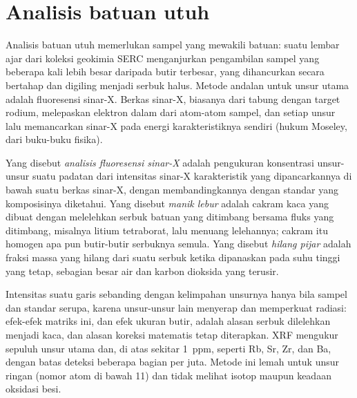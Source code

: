 
\section{Analisis batuan utuh}\label{sec:b2:field-lab-methods-2:whole-rock}

Analisis batuan utuh memerlukan sampel yang mewakili batuan: suatu lembar ajar dari koleksi geokimia
SERC menganjurkan pengambilan sampel yang beberapa kali lebih besar daripada butir terbesar,
yang dihancurkan secara bertahap dan digiling menjadi serbuk halus. Metode andalan untuk unsur utama adalah
fluoresensi sinar-X. Berkas sinar-X, biasanya dari tabung dengan target rodium, melepaskan elektron
dalam dari atom-atom sampel, dan setiap unsur lalu memancarkan sinar-X pada energi
karakteristiknya sendiri (hukum Moseley, dari buku-buku fisika).

\begin{definition}\label{def:b2:field-lab-methods-2:xrf}
Yang disebut \emph{analisis fluoresensi sinar-X} adalah pengukuran konsentrasi
unsur-unsur suatu padatan dari intensitas sinar-X karakteristik yang dipancarkannya di bawah suatu
berkas sinar-X, dengan membandingkannya dengan standar yang komposisinya diketahui. Yang disebut \emph{manik
lebur} adalah cakram kaca yang dibuat dengan melelehkan serbuk batuan yang ditimbang bersama fluks yang ditimbang,
misalnya litium tetraborat, lalu menuang lelehannya; cakram itu homogen apa pun butir-butir
serbuknya semula. Yang disebut \emph{hilang pijar} adalah fraksi massa yang
hilang dari suatu serbuk ketika dipanaskan pada suhu tinggi yang tetap, sebagian besar air dan karbon dioksida yang terusir.
\end{definition}

Intensitas suatu garis sebanding dengan kelimpahan unsurnya hanya bila sampel dan
standar serupa, karena unsur-unsur lain menyerap dan memperkuat radiasi: efek-efek matriks ini,
dan efek ukuran butir, adalah alasan serbuk dilelehkan menjadi kaca, dan alasan koreksi
matematis tetap diterapkan. XRF mengukur sepuluh unsur utama dan, di atas sekitar \qty{1}{ppm},
 seperti Rb, Sr, Zr, dan Ba, dengan batas deteksi beberapa bagian per juta. Metode ini
lemah untuk unsur ringan (nomor atom di bawah 11) dan tidak melihat isotop maupun keadaan
oksidasi besi.

